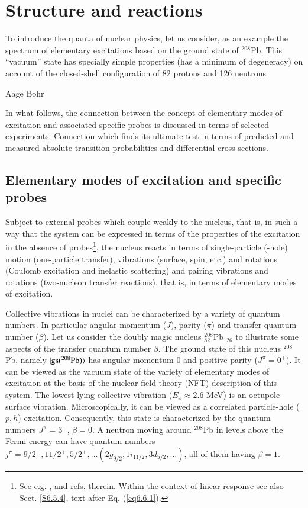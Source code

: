\chapter{Structure and reactions}\label{intro}
\epigraph{To introduce the quanta of nuclear physics, let us consider, as an example the spectrum of elementary excitations based on the ground state of $^{208}$Pb. This ``vacuum'' state has specially simple properties (has a minimum of degeneracy) on account of the closed-shell configuration of 82 protons and 126 neutrons}{Aage Bohr}
In what follows, the connection between the concept of elementary modes of excitation and associated specific probes is discussed in terms of selected experiments. Connection which finds its ultimate test in terms of predicted and measured absolute transition probabilities and differential cross sections. 
 \section{Elementary modes of excitation and specific probes}\label{S1.1}
Subject to external probes which couple weakly to the nucleus, that is, in such a way that the system can be expressed in terms of the properties of the excitation in the absence of probes\footnote{See e.g. \cite{Pines:66},\cite{Bohr:75} and refs. therein. Within the context of linear response see also Sect. \ref{S6.5.4}, text after Eq. (\ref{eq6.6.1}).}, the nucleus reacts  in terms  of single-particle (-hole) motion (one-particle transfer), vibrations (surface, spin, etc.) and rotations (Coulomb excitation and inelastic scattering) and pairing vibrations and rotations (two-nucleon transfer reactions), that is, in terms of elementary modes of excitation.


Collective vibrations in nuclei can be characterized by a variety of quantum numbers. In particular angular momentum ($J$), parity ($\pi$) and transfer quantum number ($\beta$). Let us consider the doubly magic nucleus $^{208}_{82}$Pb$_{126}$ to illustrate some aspects of the transfer quantum number $\beta$. The ground state of this nucleus $^{208}$Pb, namely $|{\text{gs}(^{208}\text{Pb})} \rangle$ has angular momentum 0 and positive parity ($J^\pi=0^+$). It can be viewed as the vacuum state of the variety of elementary modes of excitation at the basis of the nuclear field theory (NFT) description of this system. The lowest lying collective vibration ($E_x\approx2.6$ MeV) is an octupole surface vibration. Microscopically, it can be viewed as a correlated particle-hole ($p,h$) excitation. Consequently, this state is characterized by the quantum numbers $J^\pi=3^-$, $\beta=0$. A neutron moving around $^{208}$Pb in levels above the Fermi energy can have quantum numbers $j^\pi=9/2^+,11/2^+,5/2^+,\dots(2g_{9/2},1i_{11/2},3d_{5/2},\dots)$, all of them having  $\beta=1$.


